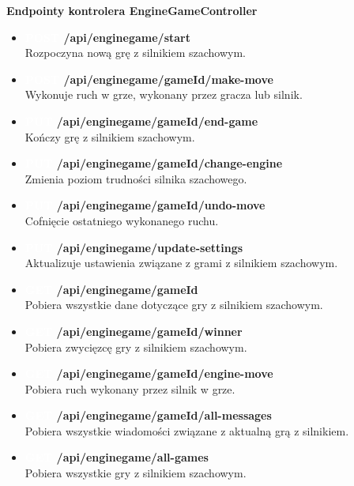 \documentclass[12pt,a4paper]{article}
\begin{document}
\textbf{Endpointy kontrolera EngineGameController}
\begin{itemize} 
    \item \textbf{\colorbox{green!90}{\textcolor{white}{POST}} /api/enginegame/start}\\
    Rozpoczyna nową grę z silnikiem szachowym. 
    \item \textbf{\colorbox{green!90}{\textcolor{white}{POST}} /api/enginegame/{gameId}/make-move}\\
    Wykonuje ruch w grze, wykonany przez gracza lub silnik.
    \item \textbf{\colorbox{orange!90}{\textcolor{white}{PUT}} /api/enginegame/{gameId}/end-game}\\
    Kończy grę z silnikiem szachowym. 
    \item \textbf{\colorbox{orange!90}{\textcolor{white}{PUT}} /api/enginegame/{gameId}/change-engine}\\
    Zmienia poziom trudności silnika szachowego. 
    \item \textbf{\colorbox{orange!90}{\textcolor{white}{PUT}} /api/enginegame/{gameId}/undo-move}\\
    Cofnięcie ostatniego wykonanego ruchu. 
    \item \textbf{\colorbox{orange!90}{\textcolor{white}{PUT}} /api/enginegame/update-settings}\\
    Aktualizuje ustawienia związane z grami z silnikiem szachowym. 
    \item \textbf{\colorbox{cyan!90}{\textcolor{white}{GET}} /api/enginegame/{gameId}}\\
    Pobiera wszystkie dane dotyczące gry z silnikiem szachowym.
    \item \textbf{\colorbox{cyan!90}{\textcolor{white}{GET}} /api/enginegame/{gameId}/winner}\\
    Pobiera zwycięzcę gry z silnikiem szachowym. 
    \item \textbf{\colorbox{cyan!90}{\textcolor{white}{GET}} /api/enginegame/{gameId}/engine-move}\\
    Pobiera ruch wykonany przez silnik w grze. 
    \item \textbf{\colorbox{cyan!90}{\textcolor{white}{GET}} /api/enginegame/{gameId}/all-messages}\\
    Pobiera wszystkie wiadomości związane z aktualną grą z silnikiem. 
    \item \textbf{\colorbox{cyan!90}{\textcolor{white}{GET}} /api/enginegame/all-games}\\
    Pobiera wszystkie gry z silnikiem szachowym. 
\end{itemize}
\end{document}
